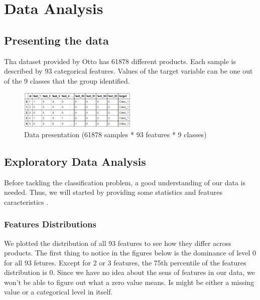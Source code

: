 \documentclass[a4paper,english,12pt, twocolumn]{article}
\begin{document}
\section{Data Analysis}
\subsection{Presenting the data}

Tha dataset provided by Otto has 61878 different products. Each sample is described by 93 categorical features. Values of the target variable can be one out of the 9 classes that the group identified. 

\begin{figure}[H]
	\centering
	\includegraphics[width=0.5\textwidth,keepaspectratio]{data}
	\caption{Data presentation (61878 samples * 93 features * 9 classes)}
\end{figure}

\subsection{Exploratory Data Analysis}

Before tackling the classification problem, a good understanding of our data is needed. Thus, we will started by providing some statistics and features caracteristics .

\subsubsection{Features Distributions}

We plotted the distribution of all 93 features to see how they differ across products. The first thing to notice in the figures below is the dominance of  level 0 for all 93 fetures. Except for 2 or 3 features, the 75th percentile of the features distribution is 0. Since we have no idea about the sens of features in our data, we won't be able to figure out what a zero value means. Is might be either a missing value or a categorical level in itself. 
\end{document}
